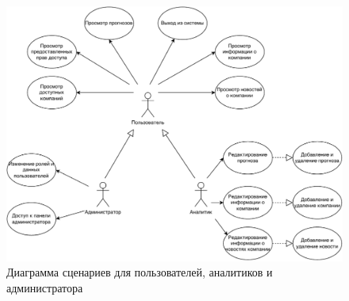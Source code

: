 \newpage

\begin{figure}[h!]
	\begin{center}
		\includegraphics[scale=0.76]{img/use-case.pdf}
	\end{center}
	\captionsetup{justification=centering}
	\caption{Диаграмма сценариев для пользователей, аналитиков и администратора}
	\label{img:use-case}
\end{figure}


\newpage

